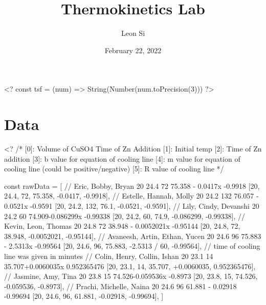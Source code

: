 \documentclass[12pt, notitlepage, letterpaper]{report}
\title{Thermokinetics Lab}
\author{Leon Si}
\date{February 22, 2022}
\begin{document}
\maketitle

<?
const tsf = (num) => String(Number(num.toPrecision(3)))
?>




\section*{Data}

<?
/*
[0]: Volume of CuSO4 Time of Zn Addition
[1]: Initial temp
[2]: Time of Zn addition
[3]: b value for equation of cooling line
[4]: m value for equation of cooling line (could be positive/negative)
[5]: R value of cooling line
*/

const rawData = [
	// Eric, Bobby, Bryan	20	24.4	72	75.358 - 0.0417x	-0.9918
	[20, 24.4, 72, 75.358, -0.0417, -0.9918],
	// Estelle, Hannah, Molly 	20	24.2	132	76.057 - 0.0521x	-0.9591
	[20, 24.2, 132, 76.1, -0.0521, -0.9591],
	// Lily, Cindy, Devanshi	20	24.2	60	74.909-0.086299x	-0.99338
	[20, 24.2, 60, 74.9, -0.086299, -0.99338],
	// Kevin, Leon, Thomas	20	24.8	72	38.948 - 0.0052021x	-0.95144
	[20, 24.8, 72, 38.948, -0.0052021, -0.95144],
	// Avaneesh, Artin, Ethan, Yucen	20	24.6	96	75.883 - 2.5313x	-0.99564
	[20, 24.6, 96, 75.883, -2.5313 / 60, -0.99564], // time of cooling line was given in minutes
	// Colin, Henry, Collin, Ishan	20	23.1	14	35.707+0.0060035x	0.952365476
	[20, 23.1, 14, 35.707, +0.0060035, 0.952365476],
	// Jasmine, Amy, Tina	20	23.8	15	74.526-0.059536x	-0.8973
	[20, 23.8, 15, 74.526, -0.059536, -0.8973],
	// Prachi, Michelle, Naina 	20	24.6	96	61.881 - 0.02918	-0.99694
	[20, 24.6, 96, 61.881, -0.02918, -0.99694],
]
\end{document}
